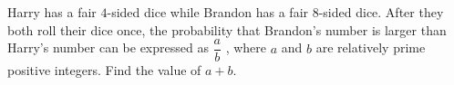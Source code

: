 Harry has a fair $4$-sided dice while Brandon has a fair $8$-sided dice. After they both roll their dice once, the probability that Brandon's number is larger than Harry's number can be expressed as $\dfrac{a}{b}$ , where $a$ and $b$ are relatively prime positive integers. Find the value of $a + b$.
